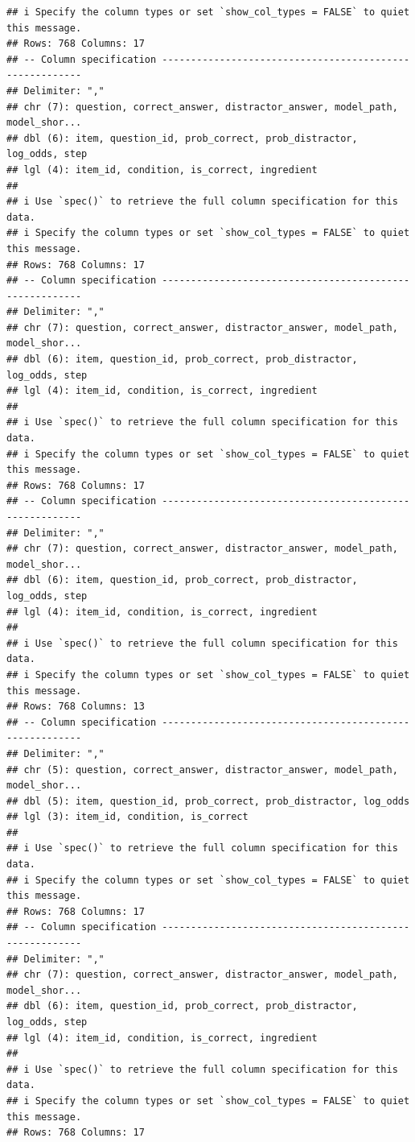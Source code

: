 \documentclass[
]{article}
\begin{document}
\begin{verbatim}
## i Specify the column types or set `show_col_types = FALSE` to quiet this message.
## Rows: 768 Columns: 17
## -- Column specification --------------------------------------------------------
## Delimiter: ","
## chr (7): question, correct_answer, distractor_answer, model_path, model_shor...
## dbl (6): item, question_id, prob_correct, prob_distractor, log_odds, step
## lgl (4): item_id, condition, is_correct, ingredient
## 
## i Use `spec()` to retrieve the full column specification for this data.
## i Specify the column types or set `show_col_types = FALSE` to quiet this message.
## Rows: 768 Columns: 17
## -- Column specification --------------------------------------------------------
## Delimiter: ","
## chr (7): question, correct_answer, distractor_answer, model_path, model_shor...
## dbl (6): item, question_id, prob_correct, prob_distractor, log_odds, step
## lgl (4): item_id, condition, is_correct, ingredient
## 
## i Use `spec()` to retrieve the full column specification for this data.
## i Specify the column types or set `show_col_types = FALSE` to quiet this message.
## Rows: 768 Columns: 17
## -- Column specification --------------------------------------------------------
## Delimiter: ","
## chr (7): question, correct_answer, distractor_answer, model_path, model_shor...
## dbl (6): item, question_id, prob_correct, prob_distractor, log_odds, step
## lgl (4): item_id, condition, is_correct, ingredient
## 
## i Use `spec()` to retrieve the full column specification for this data.
## i Specify the column types or set `show_col_types = FALSE` to quiet this message.
## Rows: 768 Columns: 13
## -- Column specification --------------------------------------------------------
## Delimiter: ","
## chr (5): question, correct_answer, distractor_answer, model_path, model_shor...
## dbl (5): item, question_id, prob_correct, prob_distractor, log_odds
## lgl (3): item_id, condition, is_correct
## 
## i Use `spec()` to retrieve the full column specification for this data.
## i Specify the column types or set `show_col_types = FALSE` to quiet this message.
## Rows: 768 Columns: 17
## -- Column specification --------------------------------------------------------
## Delimiter: ","
## chr (7): question, correct_answer, distractor_answer, model_path, model_shor...
## dbl (6): item, question_id, prob_correct, prob_distractor, log_odds, step
## lgl (4): item_id, condition, is_correct, ingredient
## 
## i Use `spec()` to retrieve the full column specification for this data.
## i Specify the column types or set `show_col_types = FALSE` to quiet this message.
## Rows: 768 Columns: 17

\end{verbatim}
\end{document}
